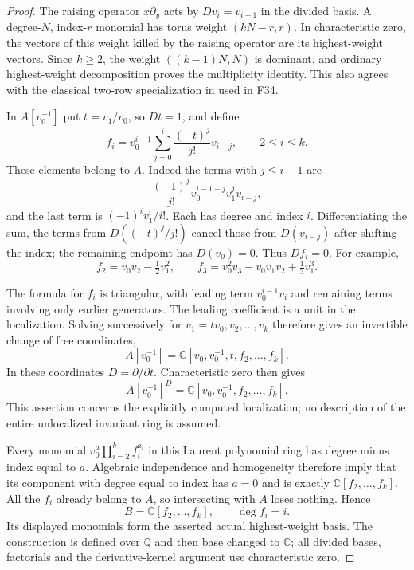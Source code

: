 \documentclass[11pt,a4paper]{article}
\newcommand{\Q}{\mathbb Q}\newcommand{\Z}{\mathbb Z}\newcommand{\C}{\mathbb C}\newcommand{\N}{\mathbb N}\newcommand{\F}{\mathbb F}
\newcommand{\fid}[1]{\textsf{#1}}\newcommand{\gate}[1]{\textsf{#1}}
\theoremstyle{named}\newtheorem{finding}{Finding}[section]
\theoremstyle{definition}\newtheorem{definition}[finding]{Definition}
\theoremstyle{remark}\newtheorem{remark}[finding]{Remark}
\begin{document}
\begin{proof}
The raising operator $x\partial_y$ acts by $Dv_i=v_{i-1}$ in
the divided basis. A degree-$N$, index-$r$ monomial has torus
weight $(kN-r,r)$. In characteristic zero, the vectors of this
weight killed by the raising operator are its highest-weight
vectors. Since $k\ge2$, the weight $((k-1)N,N)$ is dominant,
and ordinary highest-weight decomposition proves the multiplicity
identity. This also agrees with the classical two-row specialization
in \cite[Lemma~1.3, p.~2]{PPS} used in \fid{F34}.

In $A[v_0^{-1}]$ put $t=v_1/v_0$, so $Dt=1$, and define
\[
 f_i=v_0^{i-1}\sum_{j=0}^i\frac{(-t)^j}{j!}v_{i-j},
       \qquad 2\le i\le k.
\]
These elements belong to $A$. Indeed the terms with $j\le i-1$
are
\[
 \frac{(-1)^j}{j!}v_0^{i-1-j}v_1^jv_{i-j},
\]
and the last term is $(-1)^iv_1^i/i!$.
Each has degree and index $i$. Differentiating the sum, the terms
from $D((-t)^j/j!)$ cancel those from $D(v_{i-j})$ after shifting
the index; the remaining endpoint has $D(v_0)=0$.
Thus $Df_i=0$. For example,
\[
 f_2=v_0v_2-\tfrac12v_1^2,\qquad
 f_3=v_0^2v_3-v_0v_1v_2+\tfrac13v_1^3.
\]

The formula for $f_i$ is triangular, with leading term
$v_0^{i-1}v_i$ and remaining terms involving only earlier generators.
The leading coefficient is a unit in the localization. Solving
successively for $v_1=tv_0,v_2,\ldots,v_k$ therefore gives an
invertible change of free coordinates,
\[
 A[v_0^{-1}]=\C[v_0,v_0^{-1},t,f_2,\ldots,f_k].
\]
In these coordinates $D=\partial/\partial t$. Characteristic zero
then gives
\[
 A[v_0^{-1}]^D=\C[v_0,v_0^{-1},f_2,\ldots,f_k].
\]
This assertion concerns the explicitly computed localization; no
description of the entire unlocalized invariant ring is assumed.

Every monomial $v_0^a\prod_{i=2}^k f_i^{a_i}$ in this Laurent
polynomial ring has degree minus index equal to $a$.
Algebraic independence and homogeneity therefore imply that its
component with degree equal to index has $a=0$ and is exactly
$\C[f_2,\ldots,f_k]$. All the $f_i$ already belong to $A$, so
intersecting with $A$ loses nothing. Hence
\begin{equation}\label{eq:actualrayalgebra}
 B=\C[f_2,\ldots,f_k],\qquad \deg f_i=i.
\end{equation}
Its displayed monomials form the asserted actual highest-weight
basis. The construction is defined over $\Q$ and then base changed
to $\C$; all divided bases, factorials and the derivative-kernel
argument use characteristic zero.
\end{proof}
\end{document}
